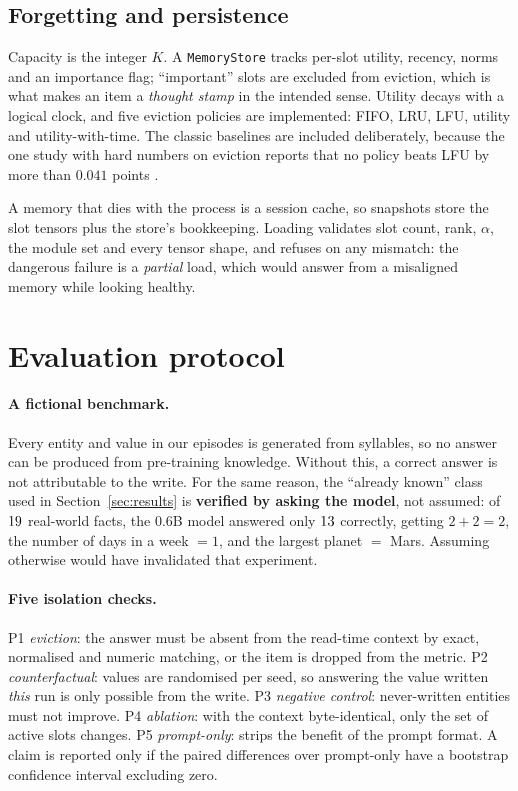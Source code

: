 \documentclass[11pt]{article}
\begin{document}
\subsection{Forgetting and persistence}

Capacity is the integer $K$. A \texttt{MemoryStore} tracks per-slot utility, recency,
norms and an importance flag;
``important'' slots are excluded from eviction, which is what makes an item a
\emph{thought stamp} in the intended sense. Utility decays with a logical clock,
and five eviction policies are implemented: FIFO, LRU, LFU, utility and utility-with-time. The classic baselines are included deliberately, because the
one study with hard numbers on eviction reports that no policy beats LFU by more
than $0.041$ points \cite{semcache}.

A memory that dies with the process is a session cache, so snapshots store the
slot tensors plus the store's bookkeeping. Loading validates slot count, rank,
$\alpha$, the module set and every tensor shape, and refuses on any mismatch: the
dangerous failure is a \emph{partial} load, which would answer from a misaligned
memory while looking healthy.

\section{Evaluation protocol}
\label{sec:protocol}

\paragraph{A fictional benchmark.} Every entity and value in our episodes is
generated from syllables, so no answer can be produced from pre-training
knowledge. Without this, a correct answer is not attributable to the write. For
the same reason, the ``already known'' class used in Section~\ref{sec:results} is
\textbf{verified by asking the model}, not assumed: of $19$ real-world
facts, the 0.6B model answered only $13$ correctly, getting $2+2 = 2$, the number
of days in a week $=1$, and the largest planet $=$ Mars. Assuming otherwise would
have invalidated that experiment.

\paragraph{Five isolation checks.} P1 \emph{eviction}: the answer must be absent
from the read-time context by exact, normalised and numeric matching, or the item
is dropped from the metric. P2 \emph{counterfactual}: values are randomised per
seed, so answering the value written \emph{this} run is only possible from the
write. P3 \emph{negative control}: never-written entities must not improve.
P4 \emph{ablation}: with the context byte-identical, only the set of active slots
changes. P5 \emph{prompt-only}: strips the benefit of the prompt format. A claim
is reported only if the paired differences over prompt-only have a bootstrap
confidence interval excluding zero.
\end{document}
